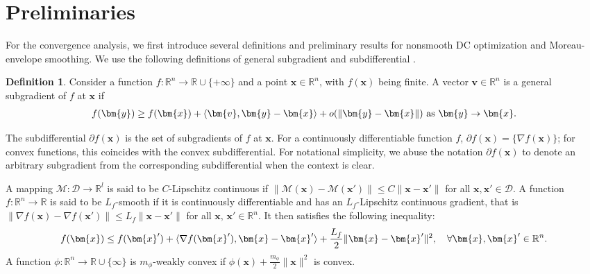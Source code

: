 \documentclass{article}
\theoremstyle{plain}
\theoremstyle{definition}
\newtheorem{definition}{Definition}[section]
\theoremstyle{remark}
\newcommand{\RR}{\mathbb{R}}
\newcommand{\bx}{\bm{x}}
\newcommand{\by}{\bm{y}}
\newcommand{\calM}{\mathcal{M}}
\newcommand{\bv}{\bm{v}}
\numberwithin{equation}{section}
\begin{document}
\section{Preliminaries}
\label{appendix:preliminaries}
For the convergence analysis, we first introduce several definitions and preliminary results for nonsmooth DC optimization and Moreau-envelope smoothing. We use the following definitions of general subgradient and subdifferential \cite{davis2019stochastic,rockafellar2009variational}.
\begin{definition}
    \label{subgradient and subdifferential}
    Consider a function $f: \RR^n \to \RR \cup \{+\infty\}$ and a point $\bx \in \RR^n$, with $f(\bx)$ being finite. A vector $\bv \in \RR^n$ is a general subgradient of \(f\) at \(\bx\) if 
\begin{align}
f(\by) \geq f(\bx) + \langle \bv, \by - \bx \rangle + o(\|\by - \bx\|) \text{ as } \by \to \bx. \notag
\end{align}
\end{definition}
The subdifferential \(\partial f(\bx)\) is the set of subgradients of $f$ at $\bx$. For a continuously differentiable function $f$, $\partial f(\bx) = \{\nabla f(\bx)\}$; for convex functions, this coincides with the convex subdifferential. For notational simplicity, we abuse the notation $\partial f(\bx)$ to denote an arbitrary subgradient from the corresponding subdifferential when the context is clear.

A mapping $\calM : \mathcal{D} \to \RR^l$ is said to be $C$-Lipschitz continuous if $\|\calM(\bx) - \calM(\bx')\| \leq C\|\bx - \bx'\|$ for all $\bx, \bx' \in \mathcal{D}$. A function $f: \RR^n\rightarrow \RR$ is said to be $L_f$-smooth if it is continuously differentiable and has an $L_f$-Lipschitz continuous gradient, that is $\| \nabla f(\bx) - \nabla f(\bx') \| \leq L_f \| \bx - \bx'\|$ for all $\bx,\, \bx' \in \RR^n$. It then satisfies the following inequality:
\begin{align}
    f(\bx) \leq f(\bx') + \langle \nabla f(\bx'), \bx - \bx' \rangle + \frac{L_f}{2} \| \bx - \bx'\|^2,  \notag
    \quad \forall \bx,\bx' \in \RR^n.
\end{align}
A function $\phi: \RR^n \rightarrow \RR \cup \{ \infty \}$ is $m_\phi$-weakly convex if $\phi(\bx) + \frac{m_\phi}{2} \|\bx\|^2$ is convex.
\end{document}
